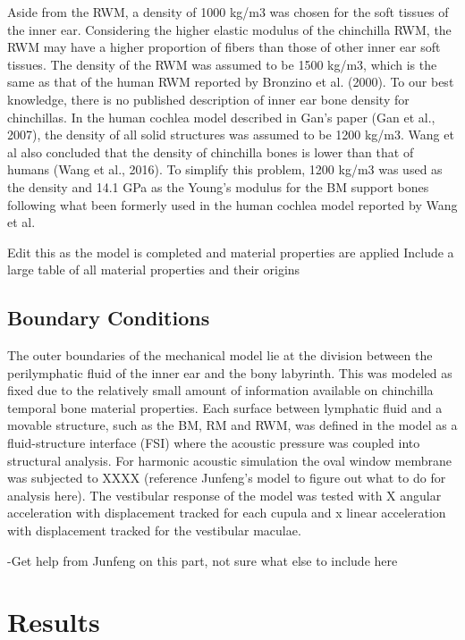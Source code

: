 \documentclass[12pt]{article}
\begin{document}
Aside from the RWM, a density of 1000 kg/m3 was chosen for the soft tissues of the inner ear. Considering the higher elastic modulus of the chinchilla RWM, the RWM may have a higher proportion of fibers than those of other inner ear soft tissues. The density of the RWM was assumed to be 1500 kg/m3, which is the same as that of the human RWM reported by Bronzino et al. (2000). To our best knowledge, there is no published description of inner ear bone density for chinchillas. In the human cochlea model described in Gan’s paper (Gan et al., 2007), the density of all solid structures was assumed to be 1200 kg/m3. Wang et al also concluded that the density of chinchilla bones is lower than that of humans (Wang et al., 2016). To simplify this problem, 1200 kg/m3 was used as the density and 14.1 GPa as the Young’s modulus for the BM support bones following what been formerly used in the human cochlea model reported by Wang et al.

Edit this as the model is completed and material properties are applied
Include a large table of all material properties and their origins


\subsection{Boundary Conditions}
The outer boundaries of the mechanical model lie at the division between the perilymphatic fluid of the inner ear and the bony labyrinth. This was modeled as fixed due to the relatively small amount of information available on chinchilla temporal bone material properties. Each surface between lymphatic fluid and a movable structure, such as the BM, RM and RWM, was defined in the model as a fluid-structure interface (FSI) where the acoustic pressure was coupled into structural analysis. For harmonic acoustic simulation the oval window membrane was subjected to XXXX (reference Junfeng's model to figure out what to do for analysis here). The vestibular response of the model was tested with X angular acceleration with displacement tracked for each cupula and x linear acceleration with displacement tracked for the vestibular maculae.

-Get help from Junfeng on this part, not sure what else to include here


\section{Results}
\end{document}

